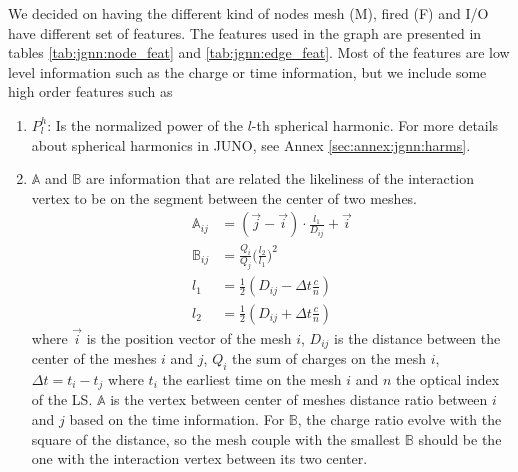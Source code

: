 \documentclass[../main.tex]{subfiles}
\begin{document}
We decided on having the different kind of nodes {\color{Dandelion} mesh (M)}, {\color{red} fired (F)} and {\color{blue} I/O} have different set of features. The features used in the graph are presented in tables \ref{tab:jgnn:node_feat} and \ref{tab:jgnn:edge_feat}. Most of the features are low level information such as the charge or time information, but we include some high order features such as
\begin{enumerate}
  \item $P^h_l$: Is the normalized power of the $l$-th spherical harmonic. For more details about spherical harmonics in JUNO, see Annex \ref{sec:annex:jgnn:harms}.
  \item $\mathbb{A}$ and $\mathbb{B}$ are information that are related the likeliness of the interaction vertex to be on the segment between the center of two meshes.
    \begin{align}
      \mathbb{A}_{ij} &= (\vec{j} - \vec{i})\cdot\frac{l_1}{D_{ij}} + \vec{i} \\
      \mathbb{B}_{ij} &= \frac{Q_i}{Q_j} \bigg(\frac{l_2}{l_1}\bigg)^2 \\
      l_1 &= \frac{1}{2}(D_{ij} - \Delta t \frac{c}{n}) \\
      l_2 &= \frac{1}{2}(D_{ij} + \Delta t \frac{c}{n})
    \end{align}
    where $\vec{i}$ is the position vector of the mesh $i$, $D_{ij}$ is the distance between the center of the meshes $i$ and $j$, $Q_i$ the sum of charges on the mesh $i$, $\Delta t = t_i - t_j$ where $t_i$ the earliest time on the mesh $i$ and $n$ the optical index of the LS. $\mathbb{A}$ is the vertex between center of meshes distance ratio between $i$ and $j$ based on the time information. For $\mathbb{B}$, the charge ratio evolve with the square of the distance, so the mesh couple with the smallest $\mathbb{B}$ should be the one with the interaction vertex between its two center.
\end{enumerate}
\end{document}
